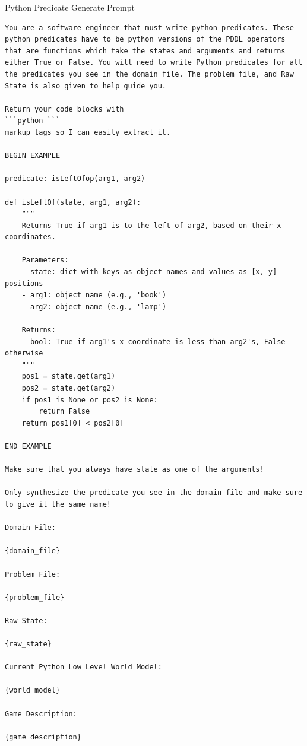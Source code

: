 \documentclass{article}
\theoremstyle{plain}
\theoremstyle{definition}
\theoremstyle{remark}
\begin{document}
\begin{mybox}[boxrule=0pt, parbox=false, opacityframe=1, colframe=black, label=box:gen_python_predicate_prompt]{Python Predicate Generate Prompt}
\begin{lstlisting}[basicstyle=\ttfamily\small, breaklines=true]
You are a software engineer that must write python predicates. These python predicates have to be python versions of the PDDL operators that are functions which take the states and arguments and returns either True or False. You will need to write Python predicates for all the predicates you see in the domain file. The problem file, and Raw State is also given to help guide you. 

Return your code blocks with
```python ```
markup tags so I can easily extract it.

BEGIN EXAMPLE

predicate: isLeftOfop(arg1, arg2)

def isLeftOf(state, arg1, arg2):
    """
    Returns True if arg1 is to the left of arg2, based on their x-coordinates.

    Parameters:
    - state: dict with keys as object names and values as [x, y] positions
    - arg1: object name (e.g., 'book')
    - arg2: object name (e.g., 'lamp')

    Returns:
    - bool: True if arg1's x-coordinate is less than arg2's, False otherwise
    """
    pos1 = state.get(arg1)
    pos2 = state.get(arg2)
    if pos1 is None or pos2 is None:
        return False
    return pos1[0] < pos2[0]

END EXAMPLE

Make sure that you always have state as one of the arguments!

Only synthesize the predicate you see in the domain file and make sure
to give it the same name!

Domain File:

{domain_file}

Problem File:

{problem_file}

Raw State:

{raw_state}

Current Python Low Level World Model:

{world_model}

Game Description:

{game_description}
\end{lstlisting}
\end{mybox}
\end{document}
